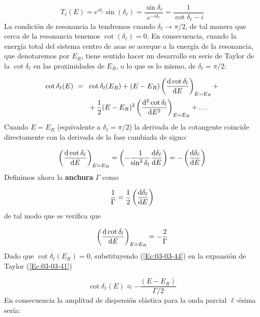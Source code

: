 \begin{equation}
 	T_\ell (E) = e^{i\delta_\ell}\sin(\delta_\ell) = \frac{\sin \delta_\ell}{ e^{-i\delta_\ell}}=\frac{1}{\cot \delta_\ell -i}
\end{equation}
La condición de resonancia la tendremos cuando $\delta_\ell \rightarrow \pi/2$, de tal manera que cerca de la resonancia tenemos $\cot (\delta_\ell)=0$. En consecuencia, cuando la energía total del sistema centro de asas se acerque a la energía de la resonancia, que denotaremos por $E_R$, tiene sentido hacer un desarrollo en serie de Taylor de la $\cot \delta_\ell$ en las proximidades de $E_R$, o lo que es lo mismo, de $\delta_\ell = \pi/2$:

\begin{equation}
	\begin{split}
	\cot \delta_\ell (E) \ = \ & \ \cot \delta_\ell (E_R) + (E-E_R) \left( \frac{\mathrm{d} \cot \delta_l}{\mathrm{d} E} \right)_{E=E_R} + \\ & \  + \frac{1}{2} (E-E_R)^2  \left( \frac{\mathrm{d} ^2\cot \delta_l}{\mathrm{d} E^2} \right)_{E=E_R} +  \ldots
	\end{split} \label{Ec:03-03-41}
\end{equation}
Cuando $E=E_R$ (equivalente a $\delta_\ell = \pi/2$) la derivada de la cotangente coincide directamente con la derivada de la fase cambiada de signo:

\begin{equation}
	\left( \frac{\mathrm{d} \cot \delta_\ell}{\mathrm{d} E} \right)_{E=E_R} = \left( - \frac{1}{\sin^2 \delta_\ell} \frac{\mathrm{d} \delta_\ell}{\mathrm{d} E} \right) = -\left( \frac{\mathrm{d} \delta_\ell}{\mathrm{d} E} \right) 
\end{equation}
Definimos ahora la \textbf{anchura} $\Gamma$ como

\begin{equation}
	\frac{1}{\Gamma} = \frac{1}{2}\left( \frac{\mathrm{d} \delta_\ell}{\mathrm{d} E} \right) 
\end{equation}
de tal modo que se verifica que

\begin{equation}
	\left( \frac{\mathrm{d} \cot \delta_l}{\mathrm{d} E} \right)_{E=E_R}  = - \frac{2}{\Gamma} \label{Ec:03-03-44}
\end{equation}
Dado que $\cot \delta_\ell(E_R)=0$, substituyendo (\ref{Ec:03-03-44}) en la expansión de Taylor (\ref{Ec:03-03-41}) 

\begin{equation}
	\cot \delta_\ell (E) \approx -\frac{(E-E_R)}{\Gamma/2}
\end{equation}
En consecuencia la amplitud de dispersión elástica para la onda parcial $\ell$-ésima sería:

